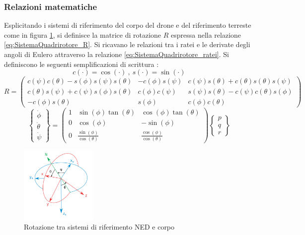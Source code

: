 \subsubsection{Relazioni matematiche}
Esplicitando i sistemi di riferimento del corpo del drone e del riferimento terreste come in figura \ref{fig:riferimenti}, si definisce la matrice di rotazione $R$ espressa nella relazione \ref{eq:SistemaQuadrirotore_R}. Si ricavano le relazioni tra i ratei e le derivate degli angoli di Eulero attraverso la relazione \ref{eq:SistemaQuadrirotore_ratei}.
Si definiscono le seguenti semplificazioni di scrittura : 
\[ 	c(\cdot)=\cos(\cdot)\ ,\  s(\cdot) = \sin(\cdot) \]
\begin{equation}
R=
	\begin{pmatrix}
	c(\psi)c(\theta)-s(\phi)s(\psi)s(\theta) & -c(\phi)s(\psi) & c(\psi)s(\theta)+c(\theta)s(\theta)s(\psi) \\ 
	c(\theta) s(\psi)+c(\psi)s(\phi)s(\theta) & c(\phi)c(\psi) & s(\psi)s(\theta)-c(\psi)c(\theta)s(\phi) \\ 
	-c(\phi)s(\theta)	& s(\phi) & c(\phi)c(\theta)
	\end{pmatrix}
	\label{eq:SistemaQuadrirotore_R}
\end{equation}
\begin{equation}
	\begin{Bmatrix}
		\dot{\phi}\\
		\dot{\theta}\\
		\dot{\psi}
		\end{Bmatrix}=
	\begin{pmatrix}
		1 & \sin(\phi)\tan(\theta) & \cos(\phi)\tan(\theta) \\ 
		0 & \cos(\phi) & -\sin(\phi) \\ 
		0 & \frac{\sin(\phi)}{\cos(\theta)} & \frac{\cos(\phi)}{\cos(\theta)}
	\end{pmatrix}
	\begin{Bmatrix}
		p\\
		q\\
		r
	\end{Bmatrix}
	\label{eq:SistemaQuadrirotore_ratei}
\end{equation}

\begin{figure}
	\centering
	\includegraphics[width=0.33\textwidth]{SistemaQuadrirotore/Figure/eulerangles.png}
	\caption{Rotazione tra sistemi di riferimento NED e corpo}
	\label{fig:riferimenti}
\end{figure}

